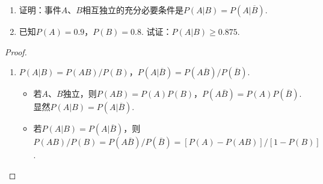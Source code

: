 \begin{problem}\leavevmode
    \begin{enumerate}
        \item 证明：事件$A$、$B$相互独立的充分必要条件是$P(A|B)=P(A|\overline B)$.
        \item 已知$P(A)=0.9$，$P(B)=0.8$. 试证：$P(A|B)\geq0.875$.
    \end{enumerate}
\end{problem}
\begin{solution}
\begin{proof}\leavevmode
    \begin{enumerate}
        \item $P(A|B)=P(AB)/P(B)$，$P(A|\overline B)=P(A\overline B)/P(\overline B)$.
        \begin{itemize}
            \item 若$A$、$B$独立，则$P(AB)=P(A)P(B)$，$P(A\overline B)=P(A)P(\overline B)$. 显然$P(A|B)=P(A|\overline B)$.
            \item 若$P(A|B)=P(A|\overline B)$，则$P(AB)/P(B)=P(A\overline B)/P(\overline B)=[P(A)-P(AB)]/[1-P(B)]$.
        \end{itemize}

    \end{enumerate}
    \renewcommand\qedsymbol{}
\end{proof}
\end{solution}